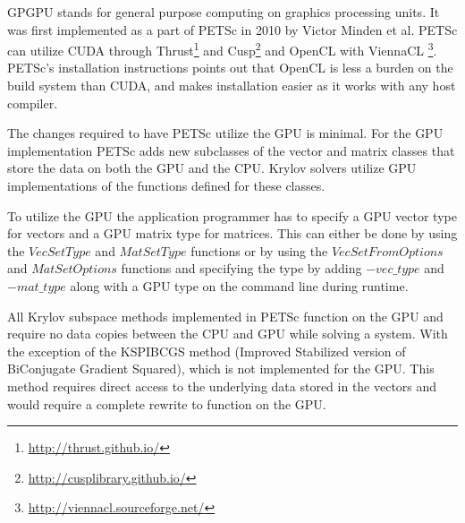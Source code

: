 GPGPU stands for general purpose computing on graphics processing units. It was 
first implemented as a part of PETSc in 2010\cite{minden2010preliminary} by Victor 
Minden et al. PETSc can utilize CUDA through Thrust\footnote{\url{http://thrust.github.io/}} 
and Cusp\footnote{\url{http://cusplibrary.github.io/}} and OpenCL with ViennaCL
\footnote{\url{http://viennacl.sourceforge.net/}}. PETSc's installation instructions 
points out that OpenCL is less a burden on the build system than CUDA, and makes 
installation easier as it works with any host compiler. 

The changes required to have PETSc utilize the GPU is minimal. For the GPU 
implementation PETSc adds new subclasses of the vector and matrix classes that 
store the data on both the GPU and the CPU. Krylov solvers utilize GPU implementations 
of the functions defined for these classes.

To utilize the GPU the application programmer has to specify a GPU vector type 
for vectors and a GPU matrix type for matrices. This can either be done by using 
the $VecSetType$ and $MatSetType$ functions or by using the $VecSetFromOptions$ 
and $MatSetOptions$ functions and specifying the type by adding $-vec\_type$ and 
$-mat\_type$ along with a GPU type on the command line during runtime. 

All Krylov subspace methods implemented in PETSc function on the GPU and require 
no data copies between the CPU and GPU while solving a system. With the exception
of the KSPIBCGS method (Improved Stabilized version of BiConjugate Gradient Squared),
which is not implemented for the GPU. This method requires direct access to the 
underlying data stored in the vectors and would require a complete rewrite to 
function on the GPU.
